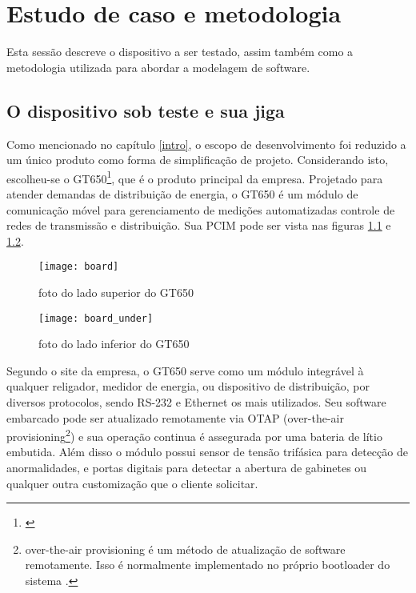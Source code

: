     \chapter{Estudo de caso e metodologia}
        Esta sessão descreve o dispositivo a ser testado, assim também como a metodologia utilizada para abordar a modelagem de software.



\section{O dispositivo sob teste e sua jiga}

        Como mencionado no capítulo \ref{intro}, o escopo de desenvolvimento foi reduzido a um único produto como forma de simplificação de projeto. Considerando isto, escolheu-se o GT650\footnote{\citep{v2com2016}}, que é o produto principal da empresa. Projetado para atender demandas de distribuição de energia, o GT650 é um módulo de comunicação móvel para gerenciamento de medições automatizadas controle de redes de transmissão e distribuição. Sua PCIM pode ser vista nas figuras \ref{fig:board} e \ref{fig:board_inf}.
        
        \begin{figure}
            \centering
            \texttt{[image: board]}
            \caption{foto do lado superior  do GT650}
            \label{fig:board}
        \end{figure}
        
        \begin{figure}
            \centering
            \texttt{[image: board\_under]}
            \caption{foto do lado inferior  do GT650}
            \label{fig:board_inf}
        \end{figure}
        
        Segundo o site da empresa, o GT650 serve como um módulo integrável à qualquer religador, medidor de energia, ou dispositivo de distribuição, por diversos protocolos, sendo RS-232 e Ethernet os mais utilizados. 
        Seu software embarcado pode ser atualizado remotamente via OTAP (over-the-air provisioning\footnote{over-the-air provisioning é um método de atualização de software remotamente. Isso é normalmente implementado no próprio bootloader do sistema \citep{jacobbeningo2013}.}) e sua operação continua é assegurada por uma bateria de lítio embutida. Além disso o módulo possui sensor de tensão trifásica para detecção de anormalidades, e portas digitais para detectar a abertura de gabinetes ou qualquer outra customização que o cliente solicitar.
        
